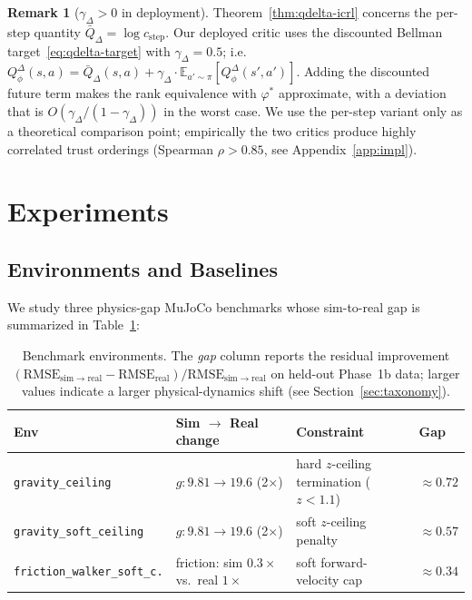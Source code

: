\documentclass{article}
\theoremstyle{definition}
\newtheorem{remark}[theorem]{Remark}
\newcommand{\QD}{Q^{\Delta}}
\begin{document}
\begin{remark}[$\gamma_\Delta>0$ in deployment]
\label{rmk:gamma-caveat}
Theorem~\ref{thm:qdelta-icrl} concerns the per-step quantity
$\bar Q_\Delta = \log c_{\mathrm{step}}$.  Our deployed critic uses the
discounted Bellman target~\eqref{eq:qdelta-target} with $\gamma_\Delta=0.5$;
i.e.\ $\QD_\phi(s,a)=\bar Q_\Delta(s,a)+\gamma_\Delta\cdot
\mathbb E_{a'\sim\pi}[\QD_\phi(s',a')]$.  Adding the discounted future
term makes the rank equivalence with $\varphi^*$ approximate, with a
deviation that is $O(\gamma_\Delta/(1-\gamma_\Delta))$ in the worst case.
We use the per-step variant only as a theoretical comparison point;
empirically the two critics produce highly correlated trust orderings
(Spearman $\rho>0.85$, see Appendix~\ref{app:impl}).
\end{remark}

\section{Experiments}
\label{sec:exp}

\subsection{Environments and Baselines}

We study three physics-gap MuJoCo benchmarks whose sim-to-real gap is
summarized in Table~\ref{tab:envs}:

\begin{table}[h]
\centering
\small
\caption{Benchmark environments. The \emph{gap} column reports the
residual improvement $(\mathrm{RMSE}_{\mathrm{sim}\to\mathrm{real}}-\mathrm{RMSE}_{\mathrm{real}})/\mathrm{RMSE}_{\mathrm{sim}\to\mathrm{real}}$
on held-out Phase~1b data; larger values indicate a larger
physical-dynamics shift (see Section~\ref{sec:taxonomy}).}
\label{tab:envs}
\begin{tabular}{llll}
\toprule
Env & Sim $\to$ Real change & Constraint & Gap \\
\midrule
\texttt{gravity\_ceiling}           & $g: 9.81 \to 19.6$ (2$\times$) & hard $z$-ceiling termination ($z<1.1$) & $\approx 0.72$ \\
\texttt{gravity\_soft\_ceiling}     & $g: 9.81 \to 19.6$ (2$\times$) & soft $z$-ceiling penalty & $\approx 0.57$ \\
\texttt{friction\_walker\_soft\_c.} & friction: sim $0.3\times$ vs.\ real $1\times$ & soft forward-velocity cap & $\approx 0.34$ \\
\bottomrule
\end{tabular}
\end{table}
\end{document}
